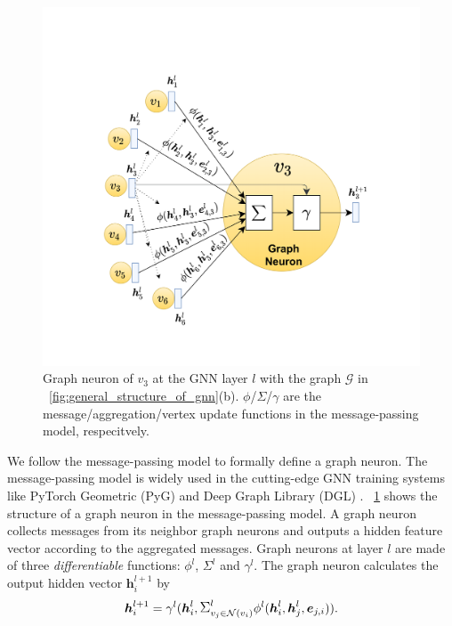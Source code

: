 \begin{figure}
	\centering
	\includegraphics[width=0.6\columnwidth]{figs/illustration/GNN_Unit.png}
	\caption{Graph neuron of $v_3$ at the GNN layer $l$ with the graph $\mathcal{G}$ in \figurename~\ref{fig:general_structure_of_gnn}(b). $\phi$/$\Sigma$/$\gamma$ are the message/aggregation/vertex update functions in the message-passing model, respecitvely.}
	\label{fig:graph_neuron_structure}
\end{figure}

We follow the message-passing model \cite{gilmer_messgae_passing} to formally define a graph neuron.
The message-passing model is widely used in the cutting-edge GNN training systems like PyTorch Geometric (PyG) \cite{PyG} and Deep Graph Library (DGL) \cite{DGL}.
\figurename~\ref{fig:graph_neuron_structure} shows the structure of a graph neuron in the message-passing model.
A graph neuron collects messages from its neighbor graph neurons and outputs a hidden feature vector according to the aggregated messages.
Graph neurons at layer $l$ are made of three \emph{differentiable} functions: $\phi^l$, $\Sigma^l$ and $\gamma^l$.
The graph neuron calculates the output hidden vector $\boldsymbol{h}^{l+1}_i$ by
$$
\boldsymbol{h}^{l+1}_i = \gamma^l(\boldsymbol{h}^l_i, \mathlarger{\Sigma}^l_{v_j \in \mathcal{N}(v_i)}{\phi^l(\boldsymbol{h}^l_i, \boldsymbol{h}^l_j,	\boldsymbol{e}_{j,i})}).
$$

